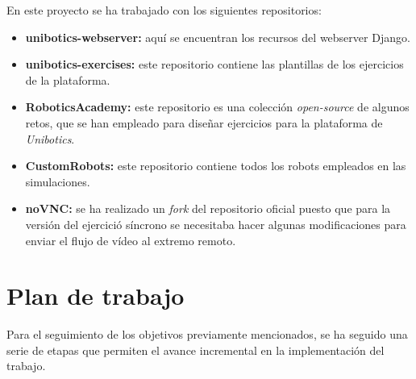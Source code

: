 \documentclass[a4paper, 12pt]{book}
\begin{document}
En este proyecto se ha trabajado con los siguientes repositorios:

\begin{itemize}
\item \textbf{unibotics-webserver:} aquí se encuentran los recursos del webserver Django.
\item \textbf{unibotics-exercises:} este repositorio contiene las plantillas de los ejercicios de la plataforma.
\item \textbf{RoboticsAcademy:} este repositorio es una colección \emph{open-source} de algunos retos, que se han empleado para diseñar ejercicios para la plataforma de \emph{Unibotics}.
\item \textbf{CustomRobots:} este repositorio contiene todos los robots empleados en las simulaciones.
\item \textbf{noVNC:} se ha realizado un \emph{fork} del repositorio oficial puesto que para la versión del ejercició síncrono se necesitaba hacer algunas modificaciones para enviar el flujo de vídeo al extremo remoto.
\end{itemize}

\section{Plan de trabajo}
\label{sec:plan-de-trabajo}

Para el seguimiento de los objetivos previamente mencionados, se ha seguido una serie de etapas que permiten el avance incremental en la implementación del trabajo.
\end{document}
